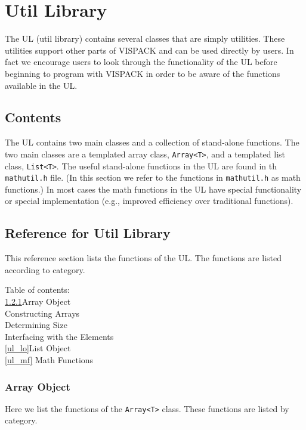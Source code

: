 \section{Util Library}
The UL (util library) contains several classes that are simply
utilities.  These utilities support other parts of VISPACK
and can be used directly by users.  In fact we encourage users
to look through the functionality of the UL before beginning to
program with VISPACK in order to be aware of the functions available
in the UL.

\subsection{Contents}
The UL contains two main classes and a collection of stand-alone functions.
The two main classes are a templated array class, {\tt Array<T>}, and
a templated list class, {\tt List<T>}.  The useful stand-alone functions
in the UL are found in th {\tt mathutil.h} file.  (In this section we refer
to the functions in {\tt mathutil.h} as math functions.)
In most cases the math functions in the UL have special functionality
or special implementation (e.g., improved efficiency over traditional
functions).

\subsection{Reference for Util Library}
\label{uref}
This reference section lists the functions of the UL.
The functions are listed according to category.

Table of contents:\\
\hspace*{0.25in}\ref{ul_ao}Array Object \\
\hspace*{0.5in}Constructing Arrays\\
\hspace*{0.5in}Determining Size\\
\hspace*{0.5in}Interfacing with the Elements\\
\hspace*{0.25in}\ref{ul_lo}List Object\\
\hspace*{0.25in}\ref{ul_mf} Math Functions\\

\subsubsection{Array Object}
\label{ul_ao}
Here we list the functions of the {\tt Array<T>} class.
These functions are listed by category.
